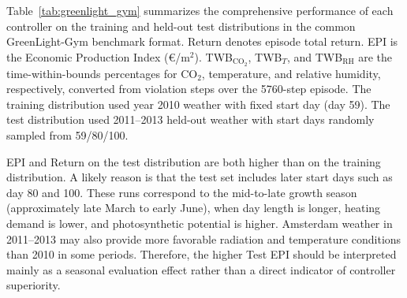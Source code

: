 \documentclass[number,preprint,review,12pt]{elsarticle}
\begin{document}
Table~\ref{tab:greenlight_gym} summarizes the comprehensive performance of each controller on the training and held-out test distributions in the common GreenLight-Gym benchmark format. Return denotes episode total return. EPI is the Economic Production Index (€/m$^2$). TWB$_{\mathrm{CO}_2}$, TWB$_T$, and TWB$_{\mathrm{RH}}$ are the time-within-bounds percentages for CO$_2$, temperature, and relative humidity, respectively, converted from violation steps over the 5760-step episode. The training distribution used year 2010 weather with fixed start day (day 59). The test distribution used 2011--2013 held-out weather with start days randomly sampled from 59/80/100.

EPI and Return on the test distribution are both higher than on the training distribution. A likely reason is that the test set includes later start days such as day 80 and 100. These runs correspond to the mid-to-late growth season (approximately late March to early June), when day length is longer, heating demand is lower, and photosynthetic potential is higher. Amsterdam weather in 2011--2013 may also provide more favorable radiation and temperature conditions than 2010 in some periods. Therefore, the higher Test EPI should be interpreted mainly as a seasonal evaluation effect rather than a direct indicator of controller superiority.

\begin{table}[H]
\centering
\caption{Comprehensive performance comparison of controllers on training and held-out test distributions}
\label{tab:greenlight_gym}
\end{table}
\end{document}
